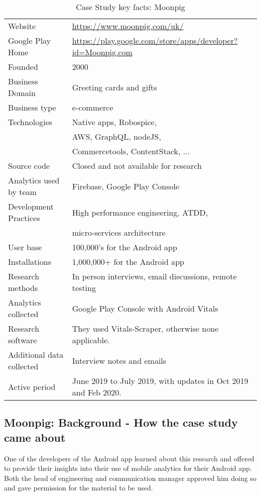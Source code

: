 {\renewcommand{\arraystretch}{0.8}%
\begin{table}[htbp!]
    \centering
    \small
    \setlength{\tabcolsep}{1pt}
    \begin{tabular}{lp{9cm}}
       \toprule
       Website &\url{https://www.moonpig.com/uk/} \\
       Google Play Home & \url{https://play.google.com/store/apps/developer?id=Moonpig.com} \\
       Founded &2000 \\
       Business Domain & Greeting cards and gifts \\
       Business type & e-commerce \\
       Technologies  & Native apps, Robospice, \\
       & AWS, GraphQL, nodeJS, \\
       & Commercetools, ContentStack, ... \\
       Source code  &Closed and not available for research \\
       Analytics used by team &Firebase, Google Play Console \\
       Development Practices & High performance engineering, ATDD, \\
         & micro-services architecture \\
       \midrule
       User base &100,000's for the Android app\\
       Installations &1,000,000+ for the Android app\\
       \midrule
       Research methods &In person interviews, email discussions, remote testing \\
       Analytics collected &Google Play Console with Android Vitals \\
       Research software &They used Vitals-Scraper, otherwise none applicable.\\
       Additional data collected &Interview notes and emails \\
       Active period &June 2019 to July 2019, with updates in Oct 2019 and Feb 2020. \\
       \bottomrule
    \end{tabular}
    \caption{Case Study key facts: Moonpig}
    \label{tab:moonpig_anaytics_overview}
\end{table}
}

\subsection{Moonpig: Background - How the case study came about}
One of the developers of the Android app learned about this research and offered to provide their insights into their use of mobile analytics for their Android app. Both the head of engineering and communication manager approved him doing so and gave permission for the material to be used.


